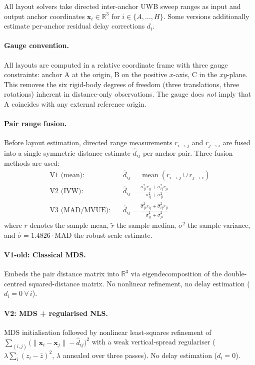 \documentclass[11pt,a4paper]{article}
\begin{document}
All layout solvers take directed inter-anchor UWB sweep ranges as input and output anchor coordinates $\mathbf{x}_i \in \mathbb{R}^3$ for $i \in \{A,\ldots,H\}$.
Some versions additionally estimate per-anchor residual delay corrections $d_i$.

\paragraph{Gauge convention.}
All layouts are computed in a relative coordinate frame with three gauge constraints:
anchor A at the origin, B on the positive $x$-axis, C in the $xy$-plane.
This removes the six rigid-body degrees of freedom (three translations, three rotations) inherent in distance-only observations.
The gauge does \emph{not} imply that A coincides with any external reference origin.

\paragraph{Pair range fusion.}
Before layout estimation, directed range measurements $r_{i \to j}$ and $r_{j \to i}$ are fused into a single symmetric distance estimate $\hat{d}_{ij}$ per anchor pair.
Three fusion methods are used:
\begin{align}
  \text{V1 (mean):} \quad & \hat{d}_{ij} = \operatorname{mean}(r_{i \to j} \cup r_{j \to i}) \\[3pt]
  \text{V2 (IVW):} \quad & \hat{d}_{ij} = \frac{\sigma_{ji}^2 \bar{r}_{ij} + \sigma_{ij}^2 \bar{r}_{ji}}{\sigma_{ij}^2 + \sigma_{ji}^2} \\[3pt]
  \text{V3 (MAD/MVUE):} \quad & \hat{d}_{ij} = \frac{\hat{\sigma}_{ji}^2 \tilde{r}_{ij} + \hat{\sigma}_{ij}^2 \tilde{r}_{ji}}{\hat{\sigma}_{ij}^2 + \hat{\sigma}_{ji}^2}
\end{align}
where $\bar{r}$ denotes the sample mean, $\tilde{r}$ the sample median, $\sigma^2$ the sample variance, and $\hat{\sigma} = 1.4826 \cdot \mathrm{MAD}$ the robust scale estimate.

\paragraph{V1-old: Classical MDS.}
Embeds the pair distance matrix into $\mathbb{R}^3$ via eigendecomposition of the double-centred squared-distance matrix.
No nonlinear refinement, no delay estimation ($d_i = 0\ \forall\,i$).

\paragraph{V2: MDS + regularised NLS.}
MDS initialisation followed by nonlinear least-squares refinement of
$\sum_{(i,j)} \bigl(\lVert\mathbf{x}_i - \mathbf{x}_j\rVert - \hat{d}_{ij}\bigr)^2$
with a weak vertical-spread regulariser ($\lambda \sum_i (z_i - \bar{z})^2$, $\lambda$ annealed over three passes).
No delay estimation ($d_i = 0$).
\end{document}
